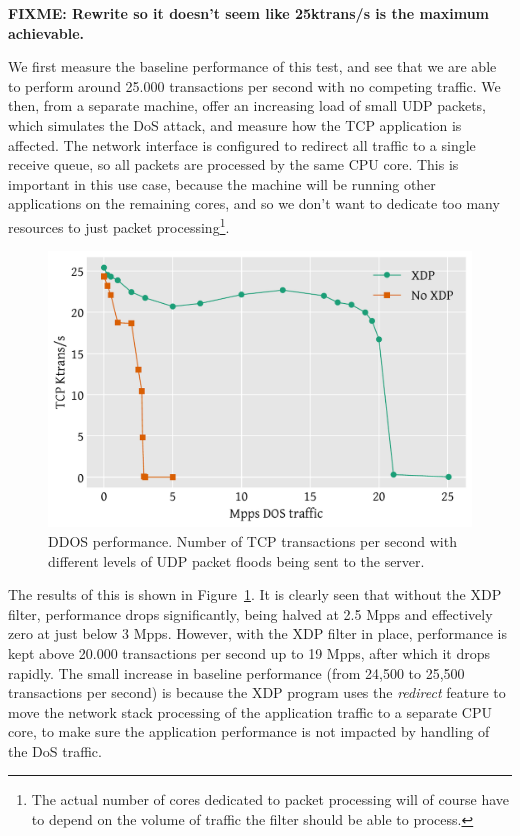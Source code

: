 \documentclass[10pt,sigconf]{acmart}
\begin{document}
\textbf{FIXME: Rewrite so it doesn't seem like 25ktrans/s is the maximum
  achievable.}

We first measure the baseline performance of this test, and see that we are able
to perform around 25.000 transactions per second with no competing traffic. We
then, from a separate machine, offer an increasing load of small UDP packets,
which simulates the DoS attack, and measure how the TCP application is affected.
The network interface is configured to redirect all traffic to a single receive
queue, so all packets are processed by the same CPU core. This is important in
this use case, because the machine will be running other applications on the
remaining cores, and so we don't want to dedicate too many resources to just
packet processing\footnote{The actual number of cores dedicated to packet
  processing will of course have to depend on the volume of traffic the filter
  should be able to process.}.

\begin{figure}[t]
\centering
\includegraphics[width=\linewidth]{figures/ddos-test.pdf}
\caption{\label{fig:ddos-results} DDOS performance. Number of TCP transactions
  per second with different levels of UDP packet floods being sent to the
  server.}
\end{figure}

The results of this is shown in Figure~\ref{fig:ddos-results}. It is clearly
seen that without the XDP filter, performance drops significantly, being halved
at 2.5 Mpps and effectively zero at just below 3 Mpps. However, with the XDP
filter in place, performance is kept above 20.000 transactions per second up to
19 Mpps, after which it drops rapidly. The small increase in baseline
performance (from 24,500 to 25,500 transactions per second) is because the XDP
program uses the \emph{redirect} feature to move the network stack processing of
the application traffic to a separate CPU core, to make sure the application
performance is not impacted by handling of the DoS traffic.
\end{document}
